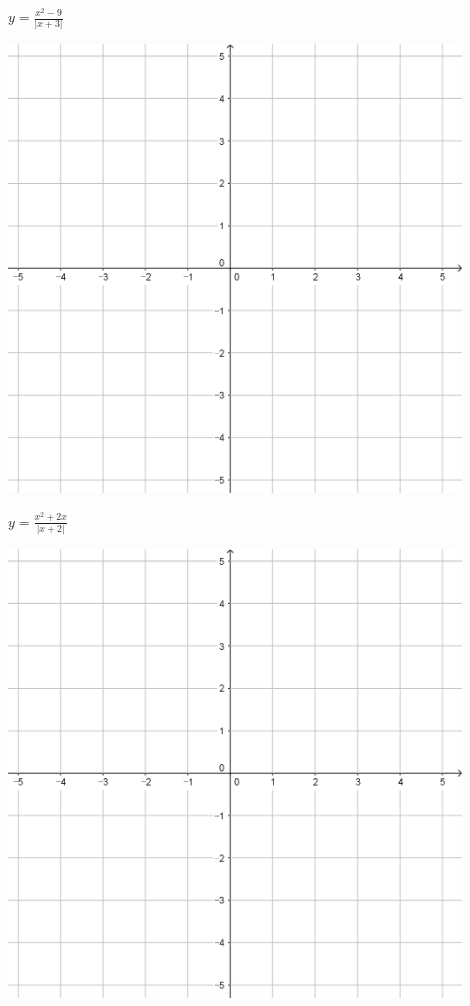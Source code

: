 \documentclass{oblivoir}
\begin{document}
\begin{minipage}{0.45\textwidth}\centering
\(y=\frac{x^2-9}{|x+3|}\)
\par\bigskip\includegraphics[width=0.9\textwidth]{55}
\end{minipage}
\begin{minipage}{0.45\textwidth}\centering
\(y=\frac{x^2+2x}{|x+2|}\)
\par\bigskip\includegraphics[width=0.9\textwidth]{55}
\end{minipage}\bigskip\bigskip\par
\end{document}
